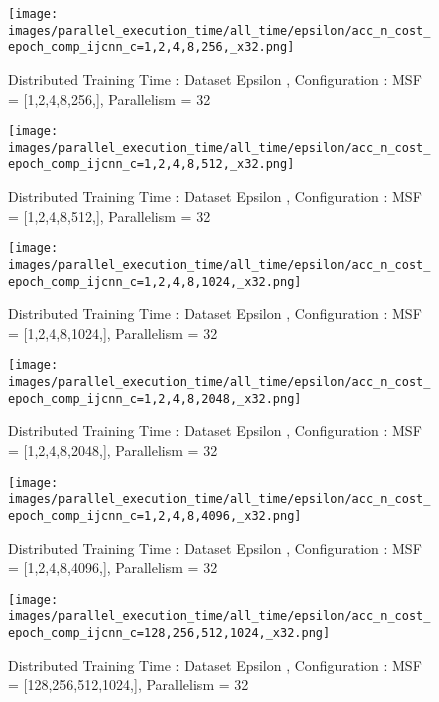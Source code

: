 \begin{figure*}[htbp]
\centering
\texttt{[image: images/parallel\_execution\_time/all\_time/epsilon/acc\_n\_cost\_epoch\_comp\_ijcnn\_c=1,2,4,8,256,\_x32.png]}
\caption{Distributed Training Time : Dataset Epsilon , Configuration : MSF = [1,2,4,8,256,], Parallelism = 32}
\label{fig:dis-msf-tr-time-epsilon-x32}
\end{figure*}


\begin{figure*}[htbp]
\centering
\texttt{[image: images/parallel\_execution\_time/all\_time/epsilon/acc\_n\_cost\_epoch\_comp\_ijcnn\_c=1,2,4,8,512,\_x32.png]}
\caption{Distributed Training Time : Dataset Epsilon , Configuration : MSF = [1,2,4,8,512,], Parallelism = 32}
\label{fig:dis-msf-tr-time-epsilon-x32}
\end{figure*}


\begin{figure*}[htbp]
\centering
\texttt{[image: images/parallel\_execution\_time/all\_time/epsilon/acc\_n\_cost\_epoch\_comp\_ijcnn\_c=1,2,4,8,1024,\_x32.png]}
\caption{Distributed Training Time : Dataset Epsilon , Configuration : MSF = [1,2,4,8,1024,], Parallelism = 32}
\label{fig:dis-msf-tr-time-epsilon-x32}
\end{figure*}


\begin{figure*}[htbp]
\centering
\texttt{[image: images/parallel\_execution\_time/all\_time/epsilon/acc\_n\_cost\_epoch\_comp\_ijcnn\_c=1,2,4,8,2048,\_x32.png]}
\caption{Distributed Training Time : Dataset Epsilon , Configuration : MSF = [1,2,4,8,2048,], Parallelism = 32}
\label{fig:dis-msf-tr-time-epsilon-x32}
\end{figure*}


\begin{figure*}[htbp]
\centering
\texttt{[image: images/parallel\_execution\_time/all\_time/epsilon/acc\_n\_cost\_epoch\_comp\_ijcnn\_c=1,2,4,8,4096,\_x32.png]}
\caption{Distributed Training Time : Dataset Epsilon , Configuration : MSF = [1,2,4,8,4096,], Parallelism = 32}
\label{fig:dis-msf-tr-time-epsilon-x32}
\end{figure*}


\begin{figure*}[htbp]
\centering
\texttt{[image: images/parallel\_execution\_time/all\_time/epsilon/acc\_n\_cost\_epoch\_comp\_ijcnn\_c=128,256,512,1024,\_x32.png]}
\caption{Distributed Training Time : Dataset Epsilon , Configuration : MSF = [128,256,512,1024,], Parallelism = 32}
\label{fig:dis-msf-tr-time-epsilon-x32}
\end{figure*}


